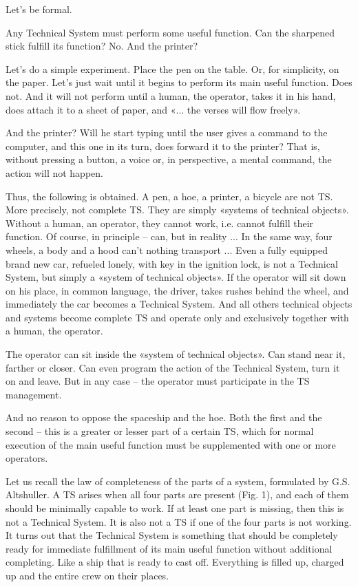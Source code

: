 \documentclass[11pt,a4paper]{article}
\begin{document}
Let's be formal.

Any Technical System must perform some useful function. Can the sharpened
stick fulfill its function? No. And the printer?

Let's do a simple experiment. Place the pen on the table. Or, for simplicity,
on the paper. Let’s just wait until it begins to perform its main useful
function.  Does not. And it will not perform until a human, the operator,
takes it in his hand, does attach it to a sheet of paper, and «... the verses
will flow freely».

And the printer? Will he start typing until the user gives a command to the
computer, and this one in its turn, does forward it to the printer? That is,
without pressing a button, a voice or, in perspective, a mental command, the
action will not happen.

Thus, the following is obtained. A pen, a hoe, a printer, a bicycle are not
TS.  More precisely, not complete TS. They are simply «systems of technical
objects». Without a human, an operator, they cannot work, i.e. cannot fulfill
their function. Of course, in principle -- can, but in reality ... In the same
way, four wheels, a body and a hood can't nothing transport ... Even a fully
equipped brand new car, refueled lonely, with key in the ignition lock, is not
a Technical System, but simply a «system of technical objects». If the
operator will sit down on his place, in common language, the driver, takes
rushes behind the wheel, and immediately the car becomes a Technical System.
And all others technical objects and systems become complete TS and operate
only and exclusively together with a human, the operator.

The operator can sit inside the «system of technical objects». Can stand near
it, farther or closer. Can even program the action of the Technical System,
turn it on and leave. But in any case -- the operator must participate in the
TS management.

And no reason to oppose the spaceship and the hoe. Both the first and the
second -- this is a greater or lesser part of a certain TS, which for normal
execution of the main useful function must be supplemented with one or more
operators.

Let us recall the law of completeness of the parts of a system, formulated by
G.S. Altshuller. A TS arises when all four parts are present (Fig. 1), and
each of them should be minimally capable to work. If at least one part is
missing, then this is not a Technical System. It is also not a TS if one of
the four parts is not working. It turns out that the Technical System is
something that should be completely ready for immediate fulfillment of its
main useful function without additional completing. Like a ship that is ready
to cast off.  Everything is filled up, charged up and the entire crew on their
places.
\end{document}
